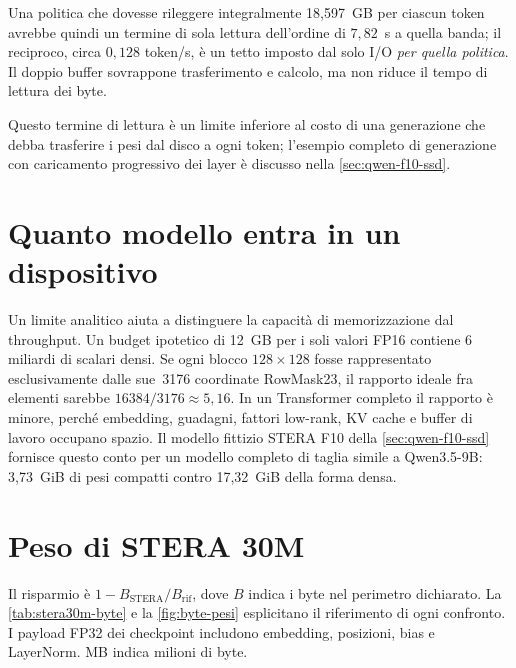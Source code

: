 Una politica che dovesse rileggere integralmente 18,597~GB per ciascun token avrebbe quindi un termine di sola lettura dell'ordine di $7{,}82$~s a quella banda; il reciproco, circa $0{,}128$ token/s, è un tetto imposto dal solo I/O \emph{per quella politica}. Il doppio buffer sovrappone trasferimento e calcolo, ma non riduce il tempo di lettura dei byte.

Questo termine di lettura è un limite inferiore al costo di una generazione che debba trasferire i pesi dal disco a ogni token; l'esempio completo di generazione con caricamento progressivo dei layer è discusso nella \autoref{sec:qwen-f10-ssd}.

\section{Quanto modello entra in un dispositivo}

Un limite analitico aiuta a distinguere la capacità di memorizzazione dal throughput. Un budget ipotetico di 12~GB per i soli valori FP16 contiene 6 miliardi di scalari densi. Se ogni blocco $128\times128$ fosse rappresentato esclusivamente dalle sue \,\num{3176} coordinate RowMask23, il rapporto ideale fra elementi sarebbe $16384/3176\approx5{,}16$. In un Transformer completo il rapporto è minore, perché embedding, guadagni, fattori low-rank, KV cache e buffer di lavoro occupano spazio. Il modello fittizio STERA F10 della \autoref{sec:qwen-f10-ssd} fornisce questo conto per un modello completo di taglia simile a Qwen3.5-9B: 3,73~GiB di pesi compatti contro 17,32~GiB della forma densa.

\section{Peso di STERA 30M}
\label{sec:stera30m-quantizzazione}

Il risparmio è $1-B_{\mathrm{STERA}}/B_{\mathrm{rif}}$, dove $B$ indica i byte nel perimetro dichiarato. La \autoref{tab:stera30m-byte} e la \autoref{fig:byte-pesi} esplicitano il riferimento di ogni confronto. I payload FP32 dei checkpoint includono embedding, posizioni, bias e LayerNorm. MB indica milioni di byte.

